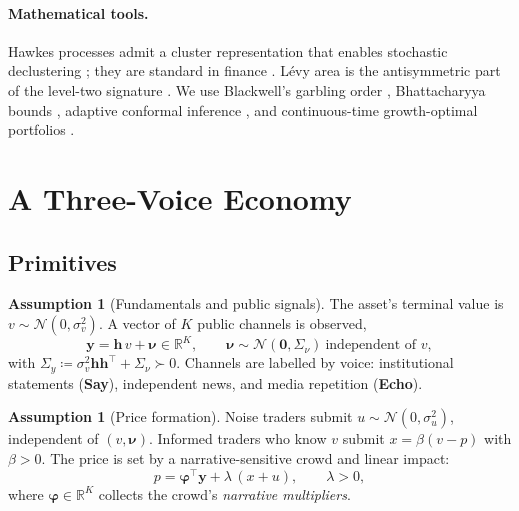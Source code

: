 \documentclass[11pt,a4paper]{article}
\theoremstyle{plain}
\theoremstyle{definition}
\newtheorem{assumption}[theorem]{Assumption}
\theoremstyle{remark}
\newcommand{\R}{\mathbb{R}}
\newcommand{\N}{\mathcal{N}}
\newcommand{\y}{\bm{y}}
\newcommand{\h}{\bm{h}}
\newcommand{\bphi}{\bm{\varphi}}
\newcommand{\SAY}{\textcolor{say}{\textbf{Say}}}
\newcommand{\ECHO}{\textcolor{echo}{\textbf{Echo}}}
\begin{document}
\paragraph{Mathematical tools.} Hawkes processes \citep{hawkes1971} admit a cluster representation \citep{hawkesoakes1974} that enables stochastic declustering \citep{zhuang2002}; they are standard in finance \citep{bacry2015}. L\'evy area \citep{levy1940} is the antisymmetric part of the level-two signature \citep{lyons1998,chevyrev2016}. We use Blackwell's garbling order \citep{blackwell1953}, Bhattacharyya bounds \citep{bhattacharyya1943,kailath1967}, adaptive conformal inference \citep{gibbs2021}, and continuous-time growth-optimal portfolios \citep{kelly1956,merton1969}.

\section{A Three-Voice Economy}\label{sec:model}

\subsection{Primitives}

\begin{assumption}[Fundamentals and public signals]\label{ass:signals}
The asset's terminal value is $v\sim\N(0,\sigma_v^2)$. A vector of $K$ public channels is observed,
\[
  \y = \h\, v + \bm\nu \in\R^K,\qquad \bm\nu\sim\N(\bm 0,\Sigma_\nu)\ \text{independent of } v,
\]
with $\Sigma_y\coloneqq\sigma_v^2\h\h^\top+\Sigma_\nu\succ0$. Channels are labelled by voice: institutional statements (\SAY), independent news, and media repetition (\ECHO).
\end{assumption}

\begin{assumption}[Price formation]\label{ass:price}
Noise traders submit $u\sim\N(0,\sigma_u^2)$, independent of $(v,\bm\nu)$. Informed traders who know $v$ submit $x=\beta(v-p)$ with $\beta>0$. The price is set by a narrative-sensitive crowd and linear impact:
\[
  p=\bphi^\top\y+\lambda\,(x+u),\qquad \lambda>0,
\]
where $\bphi\in\R^K$ collects the crowd's \emph{narrative multipliers}.
\end{assumption}
\end{document}

